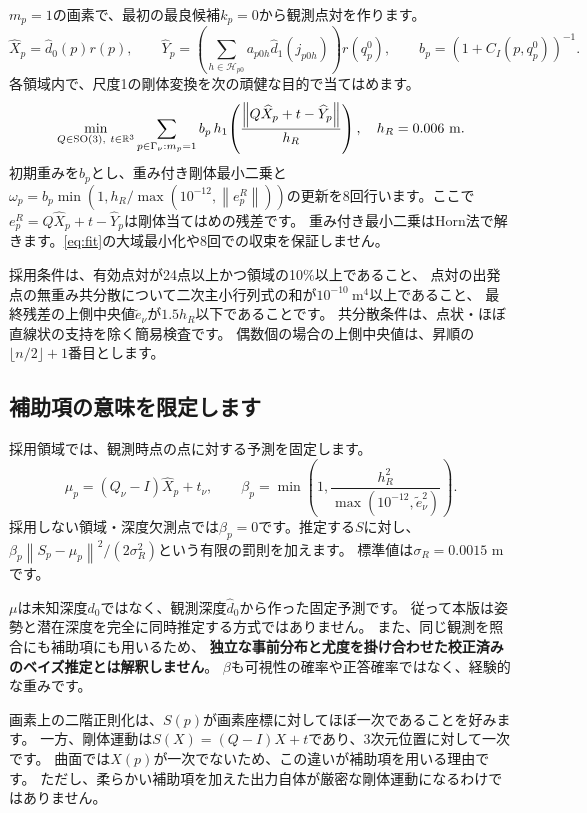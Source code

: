 \documentclass[a4paper,11pt]{ltjsarticle}
\newcommand{\R}{\mathbb R}\newcommand{\T}{\mathsf T}\newcommand{\norm}[1]{\left\lVert#1\right\rVert}
\theoremstyle{definition}
\begin{document}
$m_p=1$の画素で、最初の最良候補$k_p=0$から観測点対を作ります。
\begin{equation}
\widehat X_p=\widehat d_0(p)r(p),\qquad
\widehat Y_p=\left(\sum_{h\in\mathcal H_{p0}} a_{p0h}\widehat d_1(j_{p0h})\right)r(q_p^0),\qquad
b_p=(1+C_I(p,q_p^0))^{-1}.
\end{equation}
各領域内で、尺度1の剛体変換を次の頑健な目的で当てはめます。
\begin{equation}\label{eq:fit}
\min_{Q\in\SO(3),\ t\in\R^3}
\sum_{p\in\Gamma_\nu:m_p=1} b_p\,
 h_1\!\left(\frac{\norm{Q\widehat X_p+t-\widehat Y_p}}{h_R}\right),
\quad h_R=0.006\ \mathrm m.
\end{equation}
初期重みを$b_p$とし、重み付き剛体最小二乗と
$\omega_p=b_p\min(1,h_R/\max(10^{-12},\norm{e_p^R}))$の更新を8回行います。ここで$e_p^R=Q\widehat X_p+t-\widehat Y_p$は剛体当てはめの残差です。
重み付き最小二乗はHorn法\cite{horn}で解きます。\eqref{eq:fit}の大域最小化や8回での収束を保証しません。

採用条件は、有効点対が24点以上かつ領域の10\%以上であること、
点対の出発点の無重み共分散について二次主小行列式の和が$10^{-10}\ \mathrm m^4$以上であること、
最終残差の上側中央値$\widetilde e_\nu$が$1.5h_R$以下であることです。
共分散条件は、点状・ほぼ直線状の支持を除く簡易検査です。
偶数個の場合の上側中央値は、昇順の$\lfloor n/2\rfloor+1$番目とします。

\subsection{補助項の意味を限定します}
採用領域では、観測時点の点に対する予測を固定します。
\begin{equation}\label{eq:prior}
\mu_p=(Q_\nu-I)\widehat X_p+t_\nu,\qquad
\beta_p=\min\!\left(1,\frac{h_R^2}{\max(10^{-12},\widetilde e_\nu^2)}\right).
\end{equation}
採用しない領域・深度欠測点では$\beta_p=0$です。推定する$S$に対し、
$\beta_p\norm{S_p-\mu_p}^2/(2\sigma_R^2)$という有限の罰則を加えます。
標準値は$\sigma_R=0.0015$ mです。

$\mu$は未知深度$d_0$ではなく、観測深度$\widehat d_0$から作った固定予測です。
従って本版は姿勢と潜在深度を完全に同時推定する方式ではありません。
また、同じ観測を照合にも補助項にも用いるため、
\textbf{独立な事前分布と尤度を掛け合わせた校正済みのベイズ推定とは解釈しません}。
$\beta$も可視性の確率や正答確率ではなく、経験的な重みです。

画素上の二階正則化は、$S(p)$が画素座標に対してほぼ一次であることを好みます。
一方、剛体運動は$S(X)=(Q-I)X+t$であり、3次元位置に対して一次です。
曲面では$X(p)$が一次でないため、この違いが補助項を用いる理由です。
ただし、柔らかい補助項を加えた出力自体が厳密な剛体運動になるわけではありません。
\end{document}
